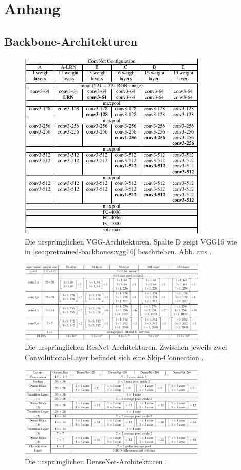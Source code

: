 \chapter{Anhang}

\section{Backbone-Architekturen}

\begin{figure}
	\centering
	\includegraphics[width=0.8\textwidth]{Bilder/vgg16-architecture.pdf} 
	\caption{Die ursprünglichen VGG-Architekturen. Spalte D zeigt VGG16 wie in \autoref{sec:pretrained-backbones:vgg16} beschrieben. Abb. aus \cite{Simonyan.04092014}.}
	\label{fig:vgg16-architecture}
\end{figure} 

\begin{figure}
	\centering
	\includegraphics[width=0.8\textwidth]{Bilder/resnet34-architecture.pdf} 
	\caption{Die ursprünglichen ResNet-Architekturen. Zwischen jeweils zwei Convolutional-Layer befindet sich eine Skip-Connection \cite{He.10122015}.}
	\label{fig:resnet34-architecture}
\end{figure} 

\begin{figure}
	\centering
	\includegraphics[width=0.8\textwidth]{Bilder/densenet121-architecture.pdf} 
	\caption{Die ursprünglichen DenseNet-Architekturen \cite{Huang.25082016}.}
	\label{fig:densenet121-architecture}
\end{figure} 